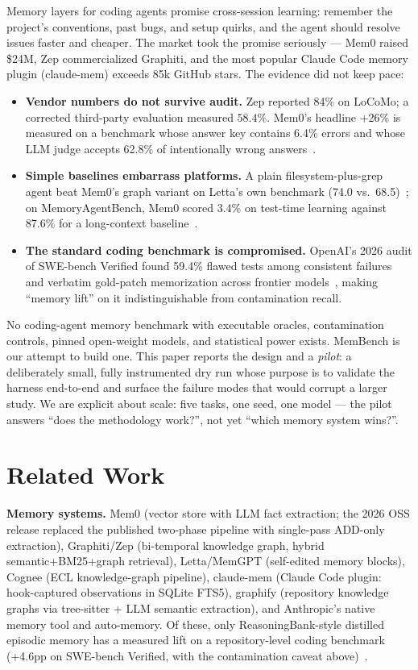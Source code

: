 \documentclass[11pt]{article}
\begin{document}
Memory layers for coding agents promise cross-session learning: remember the project's conventions, past bugs, and setup quirks, and the agent should resolve issues faster and cheaper. The market took the promise seriously --- Mem0 raised \$24M, Zep commercialized Graphiti, and the most popular Claude Code memory plugin (claude-mem) exceeds 85k GitHub stars. The evidence did not keep pace:

\begin{itemize}
  \item \textbf{Vendor numbers do not survive audit.} Zep reported 84\% on LoCoMo; a corrected third-party evaluation measured $58.4\%$. Mem0's headline +26\% is measured on a benchmark whose answer key contains 6.4\% errors and whose LLM judge accepts 62.8\% of intentionally wrong answers~\cite{locomo-audit}.
  \item \textbf{Simple baselines embarrass platforms.} A plain filesystem-plus-grep agent beat Mem0's graph variant on Letta's own benchmark (74.0 vs.\ 68.5)~\cite{letta-fs}; on MemoryAgentBench, Mem0 scored 3.4\% on test-time learning against 87.6\% for a long-context baseline~\cite{memoryagentbench}.
  \item \textbf{The standard coding benchmark is compromised.} OpenAI's 2026 audit of SWE-bench Verified found 59.4\% flawed tests among consistent failures and verbatim gold-patch memorization across frontier models~\cite{swebench-audit}, making ``memory lift'' on it indistinguishable from contamination recall.
\end{itemize}

No coding-agent memory benchmark with executable oracles, contamination controls, pinned open-weight models, and statistical power exists. MemBench is our attempt to build one. This paper reports the design and a \emph{pilot}: a deliberately small, fully instrumented dry run whose purpose is to validate the harness end-to-end and surface the failure modes that would corrupt a larger study. We are explicit about scale: five tasks, one seed, one model --- the pilot answers ``does the methodology work?'', not yet ``which memory system wins?''.

\section{Related Work}

\textbf{Memory systems.} Mem0 (vector store with LLM fact extraction; the 2026 OSS release replaced the published two-phase pipeline with single-pass ADD-only extraction), Graphiti/Zep (bi-temporal knowledge graph, hybrid semantic+BM25+graph retrieval), Letta/MemGPT (self-edited memory blocks), Cognee (ECL knowledge-graph pipeline), claude-mem (Claude Code plugin: hook-captured observations in SQLite FTS5), graphify (repository knowledge graphs via tree-sitter + LLM semantic extraction), and Anthropic's native memory tool and auto-memory. Of these, only ReasoningBank-style distilled episodic memory has a measured lift on a repository-level coding benchmark (+4.6pp on SWE-bench Verified, with the contamination caveat above)~\cite{reasoningbank}.
\end{document}
